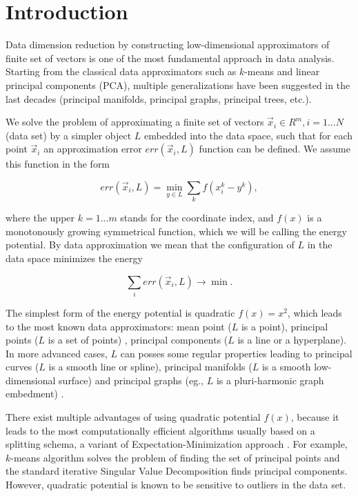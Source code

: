 \documentclass[preprint,12pt]{elsarticle}
\begin{document}

\section{Introduction}
\label{S:1}

Data dimension reduction by constructing low-dimensional approximators of finite set of vectors is one of the most fundamental approach in data analysis. Starting from the classical data approximators such as $k$-means and linear principal components (PCA), multiple generalizations have been suggested in the last decades (principal manifolds, principal graphs, principal trees, etc.)\cite{Gorban2008Principal}.

We solve the problem of approximating a finite set of vectors ${\vec{x}_i}\in R^m,i=1...N$ (data set) by a simpler object $L$ embedded into the data space, such that for each point $\vec{x}_i$ an approximation error $err(\vec{x}_i,L)$ function can be defined. We assume this function in the form

\begin{equation}\label{distance_function}
err(\vec{x}_i,L) = \min_{y\in L} \sum_k f(x_i^k-y^k),
\end{equation}

\noindent where the upper $k=1...m$ stands for the coordinate index, and $f(x)$ is a monotonously growing symmetrical function, which we will be calling the energy potential. By data approximation we mean that the configuration of $L$ in the data space minimizes the energy

$$
\sum_i err(\vec{x}_i,L) \rightarrow \min.
$$

The simplest form of the energy potential is quadratic $f(x)=x^2$, which leads to the most known data approximators: mean point ($L$ is a point), principal points ($L$ is a set of points) \cite{???}, principal components ($L$ is a line or a hyperplane). In more advanced cases, $L$ can posses some regular properties leading to principal curves ($L$ is a smooth line or spline), principal manifolds ($L$ is a smooth low-dimensional surface) and principal graphs (eg., $L$ is a pluri-harmonic graph embedment) \cite{Gorban2009}.

There exist multiple advantages of using quadratic potential $f(x)$, because it leads to the most computationally efficient algorithms usually based on a splitting schema, a variant of Expectation-Minimization approach \cite{Gorban2009}. For example, $k$-means algorithm solves the problem of finding the set of principal points and the standard iterative Singular Value Decomposition finds principal components. However, quadratic potential is known to be sensitive to outliers in the data set.
\end{document}
